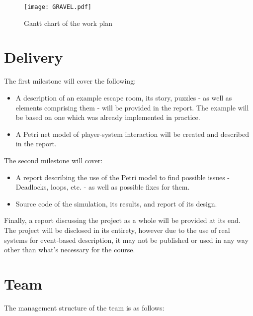 \begin{figure}[h!]
    \centering
    \texttt{[image: GRAVEL.pdf]}
    \caption{Gantt chart of the work plan}
\end{figure}

\section{Delivery}
The first milestone will cover the following:
\begin{itemize}
    \item A description of an example escape room, its story, puzzles - as well as elements comprising them - will be provided in the report. The example will be based on one which was already implemented in practice.
    \item A Petri net model of player-system interaction will be created and described in the report.
\end{itemize}
The second milestone will cover:
\begin{itemize}
    \item A report describing the use of the Petri model to find possible issues - Deadlocks, loops, etc. - as well as possible fixes for them. 
    \item Source code of the simulation, its results, and report of its design.
\end{itemize}

Finally, a report discussing the project as a whole will be provided at its end. The project will be disclosed in its entirety, however due to the use of real systems for event-based description, it may not be published or used in any way other than what's necessary for the course.

\section{Team}
The management structure of the team is as follows:\\

